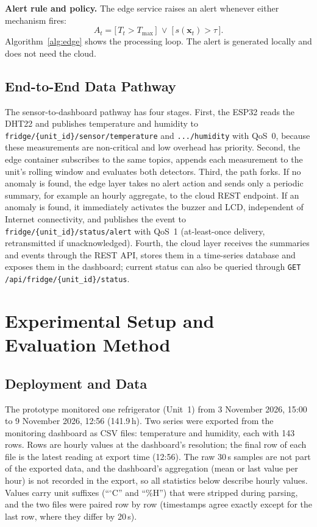 \documentclass[conference]{IEEEtran}
\newcommand{\degC}{\ensuremath{^{\circ}}C}
\newcommand{\Tmax}{\ensuremath{T_{\max}}}
\begin{document}
\textbf{Alert rule and policy.} The edge service raises an alert whenever either mechanism fires:
\begin{equation}
A_t = \big[\,T_t > \Tmax\,\big] \;\lor\; \big[\,s(\mathbf{x}_t) > \tau\,\big].
\label{eq:alert}
\end{equation}
Algorithm~\ref{alg:edge} shows the processing loop. The alert is generated locally and does not need the cloud.

\subsection{End-to-End Data Pathway}
The sensor-to-dashboard pathway has four stages. First, the ESP32 reads the DHT22 and publishes temperature and humidity to \texttt{fridge/\{unit\_id\}/sensor/temperature} and \texttt{.../humidity} with QoS~0, because these measurements are non-critical and low overhead has priority. Second, the edge container subscribes to the same topics, appends each measurement to the unit's rolling window and evaluates both detectors. Third, the path forks. If no anomaly is found, the edge layer takes no alert action and sends only a periodic summary, for example an hourly aggregate, to the cloud REST endpoint. If an anomaly is found, it immediately activates the buzzer and LCD, independent of Internet connectivity, and publishes the event to \texttt{fridge/\{unit\_id\}/status/alert} with QoS~1 (at-least-once delivery, retransmitted if unacknowledged). Fourth, the cloud layer receives the summaries and events through the REST API, stores them in a time-series database and exposes them in the dashboard; current status can also be queried through \texttt{GET /api/fridge/\{unit\_id\}/status}.

\section{Experimental Setup and Evaluation Method}
\subsection{Deployment and Data}
The prototype monitored one refrigerator (Unit~1) from 3 November 2026, 15:00 to 9 November 2026, 12:56 (141.9\,h). Two series were exported from the monitoring dashboard as CSV files: temperature and humidity, each with 143 rows. Rows are hourly values at the dashboard's resolution; the final row of each file is the latest reading at export time (12:56). The raw 30\,s samples are not part of the exported data, and the dashboard's aggregation (mean or last value per hour) is not recorded in the export, so all statistics below describe hourly values. Values carry unit suffixes (``\degC'' and ``\%H'') that were stripped during parsing, and the two files were paired row by row (timestamps agree exactly except for the last row, where they differ by 20\,s).
\end{document}
